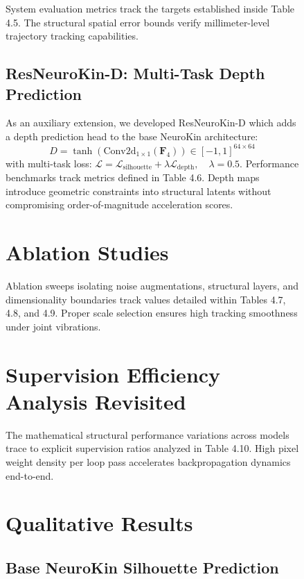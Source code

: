\documentclass[12pt,a4paper,oneside]{report}
\begin{document}
\begin{figure}[H]
System evaluation metrics track the targets established inside Table 4.5. The structural spatial error bounds verify millimeter-level trajectory tracking capabilities.

\subsection{ResNeuroKin-D: Multi-Task Depth Prediction}

As an auxiliary extension, we developed ResNeuroKin-D which adds a depth prediction head to the base NeuroKin architecture:
\begin{equation}
\hat{D} = \tanh(\text{Conv2d}_{1\times1}(\mathbf{F}_4)) \in [-1, 1]^{64 \times 64}
\end{equation}
with multi-task loss: $\mathcal{L} = \mathcal{L}_{\text{silhouette}} + \lambda \mathcal{L}_{\text{depth}}, \quad \lambda = 0.5$. Performance benchmarks track metrics defined in Table 4.6. Depth maps introduce geometric constraints into structural latents without compromising order-of-magnitude acceleration scores.

\section{Ablation Studies}

Ablation sweeps isolating noise augmentations, structural layers, and dimensionality boundaries track values detailed within Tables 4.7, 4.8, and 4.9. Proper scale selection ensures high tracking smoothness under joint vibrations.

\section{Supervision Efficiency Analysis Revisited}

The mathematical structural performance variations across models trace to explicit supervision ratios analyzed in Table 4.10. High pixel weight density per loop pass accelerates backpropagation dynamics end-to-end.

\section{Qualitative Results}

\subsection{Base NeuroKin Silhouette Prediction}


\end{figure}
\end{document}
